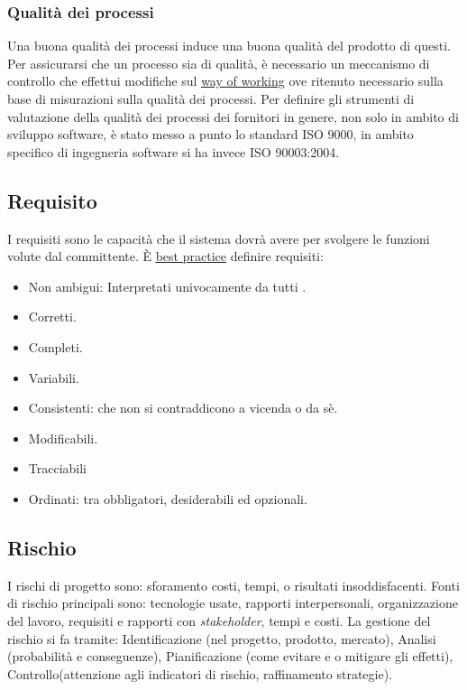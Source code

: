 	\subsubsection{Qualità dei processi}
	Una buona qualità dei processi induce una buona qualità del prodotto di questi. Per assicurarsi che un processo sia di qualità, è necessario un meccanismo di controllo che effettui modifiche sul \underline{\hyperref[sec:wow]{\underline{\hyperref[sec:wow]{way of working}}}} ove ritenuto necessario sulla base di misurazioni sulla qualità dei processi. Per definire gli strumenti di valutazione della qualità dei processi dei fornitori in genere, non solo in ambito di sviluppo software, è stato messo a punto lo standard ISO 9000, in ambito specifico di ingegneria software si ha invece ISO 90003:2004.
	
		\newpage


	\subsection{Requisito}
	\label{sec:requisito}
	I requisiti sono le capacità che il sistema dovrà avere per svolgere le funzioni volute dal committente. È \underline{\hyperref[sec:bestpractice]{best practice}} definire requisiti:
	\begin{itemize}  
	\item Non ambigui: Interpretati univocamente da tutti .
	\item Corretti.
	\item Completi.
	\item Variabili.
	\item Consistenti: che non si contraddicono a vicenda o da sè.
	\item Modificabili.
	\item Tracciabili
	\item Ordinati: tra obbligatori, desiderabili ed opzionali. 
	\end{itemize}

	\subsection{Rischio}
	\label{sec:rischio}
	I rischi di progetto sono: sforamento costi, tempi, o risultati insoddisfacenti. Fonti di rischio principali sono:
	tecnologie usate, rapporti interpersonali, organizzazione del lavoro, requisiti e rapporti con  \emph{stakeholder}, tempi e costi.
	La gestione del rischio si fa tramite:
	Identificazione (nel progetto, prodotto, mercato), Analisi (probabilità e conseguenze), Pianificazione (come evitare e o mitigare gli effetti), Controllo(attenzione agli indicatori di rischio, raffinamento strategie).
	
